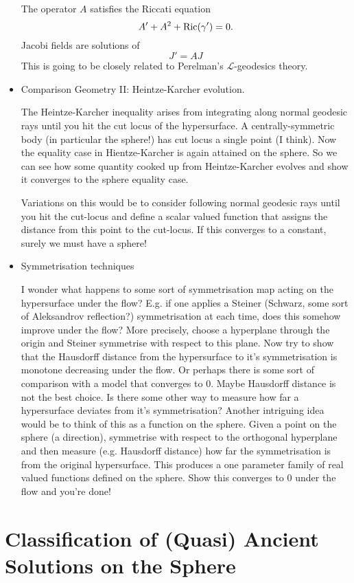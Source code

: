 \documentclass{amsart}
\begin{document}
\begin{itemize}
The operator $A$ satisfies the Riccati equation
\[
A' + A^2 + \operatorname{\text{Ric}}(\gamma') = 0.
\]
Jacobi fields are solutions of
\[
J' = A J
\]
This is going to be closely related to Perelman's $\mathcal{L}$-geodesics theory.

\item Comparison Geometry II: Heintze-Karcher evolution.

The Heintze-Karcher inequality arises from integrating along normal geodesic rays until you hit the cut locus of the hypersurface. A centrally-symmetric body (in particular the sphere!) has cut locus a single point (I think). Now the equality case in Hientze-Karcher is again attained on the sphere. So we can see how some quantity cooked up from Heintze-Karcher evolves and show it converges to the sphere equality case. 

Variations on this would be to consider following normal geodesic rays until you hit the cut-locus and define a scalar valued function that assigns the distance from this point to the cut-locus. If this converges to a constant, surely we must have a sphere!

\item Symmetrisation techniques

I wonder what happens to some sort of symmetrisation map acting on the hypersurface under the flow? E.g. if one applies a Steiner (Schwarz, some sort of Aleksandrov reflection?) symmetrisation at each time, does this somehow improve under the flow? More precisely, choose a hyperplane through the origin and Steiner symmetrise with respect to this plane. Now try to show that the Hausdorff distance from the hypersurface to it's symmetrisation is monotone decreasing under the flow. Or perhaps there is some sort of comparison with a model that converges to $0$. Maybe Hausdorff distance is not the best choice. Is there some other way to measure how far a hypersurface deviates from it's symmetrisation? Another intriguing idea would be to think of this as a function on the sphere. Given a point on the sphere (a direction), symmetrise with respect to the orthogonal hyperplane and then measure (e.g. Hausdorff distance) how far the symmetrisation is from the original hypersurface. This produces a one parameter family of real valued functions defined on the sphere. Show this converges to $0$ under the flow and you're done!
\end{itemize}

\section{Classification of (Quasi) Ancient Solutions on the Sphere}
\end{document}
